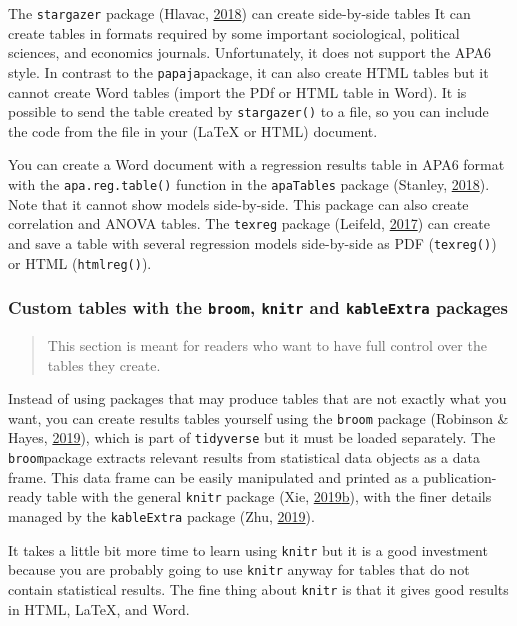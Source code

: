 \documentclass[doc,floatsintext]{apa6}
\begin{document}
The \texttt{stargazer} package (Hlavac,
\protect\hyperlink{ref-R-stargazer}{2018}) can create side-by-side
tables It can create tables in formats required by some important
sociological, political sciences, and economics journals. Unfortunately,
it does not support the APA6 style. In contrast to the
\texttt{papaja}package, it can also create HTML tables but it cannot
create Word tables (import the PDf or HTML table in Word). It is
possible to send the table created by \texttt{stargazer()} to a file, so
you can include the code from the file in your (LaTeX or HTML) document.

You can create a Word document with a regression results table in APA6
format with the \texttt{apa.reg.table()} function in the
\texttt{apaTables} package (Stanley,
\protect\hyperlink{ref-R-apaTables}{2018}). Note that it cannot show
models side-by-side. This package can also create correlation and ANOVA
tables. The \texttt{texreg} package (Leifeld,
\protect\hyperlink{ref-R-texreg}{2017}) can create and save a table with
several regression models side-by-side as PDF (\texttt{texreg()}) or
HTML (\texttt{htmlreg()}).

\subsubsection{\texorpdfstring{Custom tables with the \texttt{broom},
\texttt{knitr} and \texttt{kableExtra}
packages}{Custom tables with the broom, knitr and kableExtra packages}}\label{customtables}

\begin{quote}
This section is meant for readers who want to have full control over the
tables they create.
\end{quote}

Instead of using packages that may produce tables that are not exactly
what you want, you can create results tables yourself using the
\texttt{broom} package (Robinson \& Hayes,
\protect\hyperlink{ref-R-broom}{2019}), which is part of
\texttt{tidyverse} but it must be loaded separately. The
\texttt{broom}package extracts relevant results from statistical data
objects as a data frame. This data frame can be easily manipulated and
printed as a publication-ready table with the general \texttt{knitr}
package (Xie,
\protect\hyperlink{ref-R-knitr}{2019}\protect\hyperlink{ref-R-knitr}{b}),
with the finer details managed by the \texttt{kableExtra} package (Zhu,
\protect\hyperlink{ref-R-kableExtra}{2019}).

It takes a little bit more time to learn using \texttt{knitr} but it is
a good investment because you are probably going to use \texttt{knitr}
anyway for tables that do not contain statistical results. The fine
thing about \texttt{knitr} is that it gives good results in HTML, LaTeX,
and Word.
\end{document}
